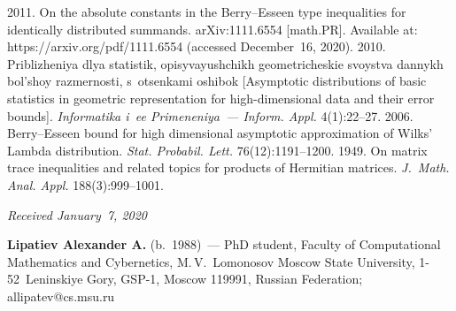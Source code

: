 \begin{multicols}{2}
{{\begin{thebibliography}{99}
 2011. On the absolute constants in the Berry--Esseen type inequalities 
for identically distributed summands. arXiv:1111.6554 [math.PR]. Available at: 
{\sf https://arxiv.org/pdf/1111.6554} (accessed December~16, 2020).
 2010. Priblizheniya dlya statistik, opisyvayushchikh geo\-met\-ri\-che\-skie svoystva dannykh 
 bol'shoy razmernosti, s~otsenkami oshibok [Asymptotic distributions of basic statistics in 
 geometric representation for high-dimensional data and their error bounds]. 
 \textit{Informatika i~ee Primeneniya~--- Inform. Appl.} 4(1):22--27.
 2006. 
Berry--Esseen bound for high dimensional asymptotic approximation of Wilks' Lambda distribution. 
\textit{Stat. Probabil. Lett.} 76(12):1191--1200.
 1949. On matrix trace inequalities and related topics for products of Hermitian matrices. 
\textit{J.~Math. Anal. Appl.} 188(3):999--1001.
 \end{thebibliography}

 }
 }

\end{multicols}

\vspace*{-3pt}

  \hfill{\small\textit{Received January~7, 2020}}




\Contrl

\noindent
\textbf{Lipatiev Alexander A.} (b.\ 1988)~--- 
PhD student,  Faculty of Computational Mathematics and Cybernetics,
 M.\,V.~Lomonosov Moscow State University, 1-52~Leninskiye Gory, GSP-1, Moscow 119991, 
 Russian Federation; \mbox{allipatev@cs.msu.ru}


\label{end\stat}

\renewcommand{\bibname}{\protect\rm Литература}